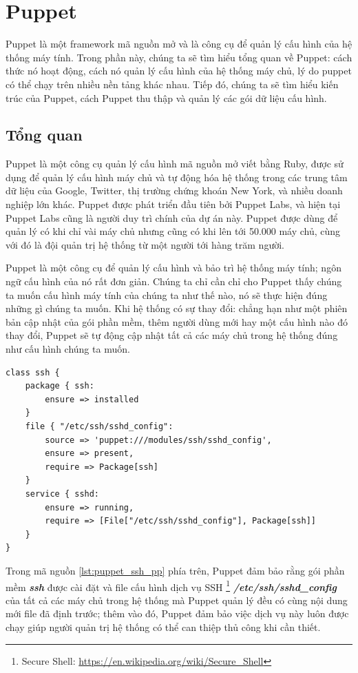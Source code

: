 \section{Puppet}
Puppet là một framework mã nguồn mở và là công cụ để quản lý cấu hình của hệ thống máy tính. Trong phần này, chúng ta sẽ tìm hiểu tổng quan về Puppet: cách thức nó hoạt động, cách nó quản lý cấu hình của hệ thống máy chủ, lý do puppet có thể chạy trên nhiều nền tảng khác nhau. Tiếp đó, chúng ta sẽ tìm hiểu kiến trúc của Puppet, cách Puppet thu thập và quản lý các gói dữ liệu cấu hình.

\subsection{Tổng quan}
Puppet là một công cụ quản lý cấu hình mã nguồn mở viết bằng Ruby, được sử dụng để quản lý cấu hình máy chủ và tự động hóa hệ thống trong các trung tâm dữ liệu của Google, Twitter, thị trường chứng khoán New York, và nhiều doanh nghiệp lớn khác. Puppet được phát triển đầu tiên bởi Puppet Labs, và hiện tại Puppet Labs cũng là người duy trì chính của dự án này. Puppet được dùng để quản lý có khi chỉ vài máy chủ nhưng cũng có khi lên tới 50.000 máy chủ, cùng với đó là đội quản trị hệ thống từ một người tới hàng trăm người.

Puppet là một công cụ để quản lý cấu hình và bảo trì hệ thống máy tính; ngôn ngữ cấu hình của nó rất đơn giản. Chúng ta chỉ cần chỉ cho Puppet thấy chúng ta muốn cấu hình máy tính của chúng ta như thế nào, nó sẽ thực hiện đúng những gì chúng ta muốn. Khi hệ thống có sự thay đổi: chẳng hạn như một phiên bản cập nhật của gói phần mềm, thêm người dùng mới hay một cấu hình nào đó thay đổi, Puppet sẽ tự động cập nhật tất cả các máy chủ trong hệ thống đúng như cấu hình chúng ta muốn.

\newpage
\clearpage

\begin{lstlisting}[label={lst:puppet_ssh_pp},caption={Ví dụ về ngôn ngữ cấu hình của Puppet},morekeywords={class, package, file, source, ensure, require, service, File, Package}]
class ssh {
    package { ssh:
        ensure => installed
    }
    file { "/etc/ssh/sshd_config":
        source => 'puppet:///modules/ssh/sshd_config',
        ensure => present,
        require => Package[ssh]
    }
    service { sshd:
        ensure => running,
        require => [File["/etc/ssh/sshd_config"], Package[ssh]]
    }
}
\end{lstlisting}


Trong mã nguồn \ref{lst:puppet_ssh_pp} phía trên, Puppet đảm bảo rằng gói phần mềm \textbf{\textit{ssh}} được cài đặt và file cấu hình dịch vụ SSH \footnote{Secure Shell: \url{https://en.wikipedia.org/wiki/Secure_Shell}} \textbf{\textit{/etc/ssh/sshd\_config}} của tất cả các máy chủ trong hệ thống mà Puppet quản lý đều có cùng nội dung mới file đã định trước; thêm vào đó, Puppet đảm bảo việc dịch vụ này luôn được chạy giúp người quản trị hệ thống có thể can thiệp thủ công khi cần thiết.


